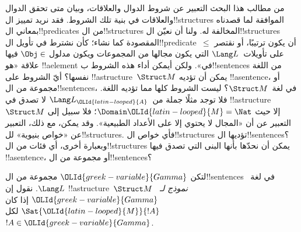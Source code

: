 \documentclass[../../../include/open-logic-section]{subfiles}
\begin{document}


\begin{explain}
من مطالب هذا البحث التعبير عن شروط الدوال والعلاقات، وبيان
متى تحقق الدوال والعلاقات في بنية تلك الشروط. فقد نريد تمييز
ال!!{structure}s الموافقة لما قصدناه بمعاني ال!!{predicate}s
من ال!!{structure}s المخالفة له. ولنا أن نعيّن
ال!!{structure}s المقصودة كما نشاء؛ كأن نشترط في تأويل
ال!!{predicate}~$\le$ أن يكون ترتيبًا، أو نقتصر على تأويلات~$\Lang
L$ التي يكون مجالها من المجموعات ويكون مدلول $\Obj \in$ فيها
علاقة «هو !!a{element} في». ولكن أيمكن أداء هذه الشروط
ب!!{sentence}s من اللغة نفسها؟ أيّ الشروط على
!!a{structure}~$\Struct M$ يمكن أن تؤديه
!!a{sentence}، أو مجموعة من ال!!{sentence}s، في لغة~$\Struct
M$؟ ليست الشروط كلها مما تؤديه اللغة. فلا توجد مثلًا جملة
من~$\Lang L_\OLId{latin-looped}{A}$ لا تصدق في !!a{structure}~$\Struct M$ إلا حيث
$\Domain \OLId{latin-looped}{M} = \Nat$؛ فلا سبيل إلى التعبير عن أن «المجال لا يحتوي
إلا على الأعداد الطبيعية». وقد يمكن، مع ذلك، التعبير عن «خواص
بنيوية» لل!!{structure}s. فأي خواص ال!!{structure}s تؤديها
ال!!{sentence}s؟ وبعبارة أخرى، أي فئات من ال!!{structure}s
يمكن أن نحدّها بأنها البنى التي تصدق فيها !!a{sentence}، أو
مجموعة من ال!!{sentence}s؟
\end{explain}

\begin{defn}
لتكن $\OLId{greek-variable}{Gamma}$ مجموعة من ال!!{sentence}s في لغة~$\Lang L$. نقول إن
!!a{structure}~$\Struct M$ \emph{نموذج لـ}~$\OLId{greek-variable}{Gamma}$ إذا كان
$\Sat{\OLId{latin-looped}{M}}{!A}$ لكل $!A \in \OLId{greek-variable}{Gamma}$.
\end{defn}
\end{document}
